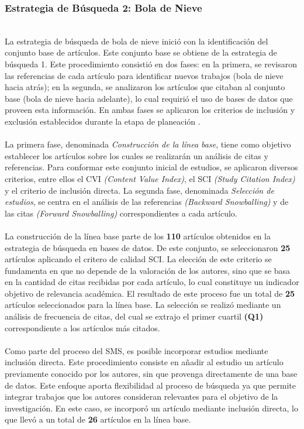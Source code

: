 \subsubsection{Estrategia de Búsqueda 2: Bola de Nieve}
\mbox{}\\
La estrategia de búsqueda de bola de nieve inició con la identificación del conjunto base de artículos. Este conjunto base se obtiene de la estrategia de búsqueda 1. Este procedimiento consistió en dos fases: en la primera, se revisaron las referencias de cada artículo para identificar nuevos trabajos (bola de nieve hacia atrás); en la segunda, se analizaron los artículos que citaban al conjunto base (bola de nieve hacia adelante), lo cual requirió el uso de bases de datos que proveen esta información. En ambas fases se aplicaron los criterios de inclusión y exclusión establecidos durante la etapa de planeación \cite{10.1145/2601248.2601268}. \\ \\
La primera fase, denominada \textit{Construcción de la línea base}, tiene como objetivo establecer los artículos sobre los cuales se realizarán un análisis de citas y referencias. Para conformar este conjunto inicial de estudios, se aplicaron diversos criterios, entre ellos el CVI \textit{(Content Value Index)}, el SCI \textit{(Study Citation Index)} y el criterio de inclusión directa. La segunda fase, denominada \textit{Selección de estudios}, se centra en el análisis de las referencias \textit{(Backward Snowballing)} y de las citas \textit{(Forward Snowballing)} correspondientes a cada artículo. \\ \\
La construcción de la línea base parte de los \textbf{110} artículos obtenidos en la estrategia de búsqueda en bases de datos. De este conjunto, se seleccionaron \textbf{25} artículos aplicando el critero de calidad SCI. La elección de este criterio se fundamenta en que no depende de la valoración de los autores, sino que se basa en la cantidad de citas recibidas por cada artículo, lo cual constituye un indicador objetivo de relevancia académica. El resultado de este proceso fue un total de \textbf{25} artículos seleccionados para la línea base. La selección se realizó mediante un análisis de frecuencia de citas, del cual se extrajo el primer cuartil \textbf{(Q1)} correspondiente a los artículos más citados.\\ \\
Como parte del proceso del SMS, es posible incorporar estudios mediante inclusión directa. Este procedimiento consiste en añadir al estudio un artículo previamente conocido por los autores, sin que provenga directamente de una base de datos. Este enfoque aporta flexibilidad al proceso de búsqueda ya que permite integrar trabajos que los autores consideran relevantes para el objetivo de la investigación. En este caso, se incorporó un artículo mediante inclusión directa, lo que llevó a un total de \textbf{26} artículos en la línea base.\\ \\
